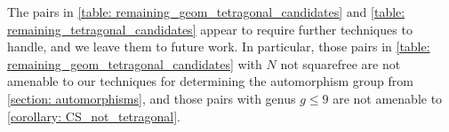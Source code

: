 \documentclass[11pt,reqno]{amsart}
\newcommand{\Q}{\mathbb{Q}}
\theoremstyle{definition}
\newcommand{\Claudio}[1]{{\color{violet}{;-) #1}}}
\begin{document}

The pairs in \cref{table: remaining_geom_tetragonal_candidates} and \cref{table: remaining_tetragonal_candidates} appear to require further techniques to handle, and we leave them to future work. In particular, those pairs in \cref{table: remaining_geom_tetragonal_candidates} with $N$ not squarefree are not amenable to our techniques for determining the automorphism group from \cref{section: automorphisms}, and those pairs with genus $g \leq 9$ are not amenable to \cref{corollary: CS_not_tetragonal}.
\end{document}
